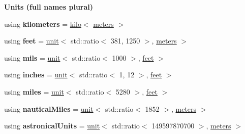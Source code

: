 \begin{Indent}{\bf Units (full names plural)}
\begin{DoxyCompactItemize}
\item 
\hypertarget{namespaceunits_1_1length_ac0c991764c90f8bdf9300e8eeadca808}{}using {\bfseries kilometers} = \hyperlink{group___unit_manipulators_ga89965a45aaa6689548b9c53858759c5e}{kilo}$<$ \hyperlink{structunits_1_1unit}{meters} $>$\label{namespaceunits_1_1length_ac0c991764c90f8bdf9300e8eeadca808}

\item 
\hypertarget{namespaceunits_1_1length_ae0a92d647c8d36063046311f0bee37b6}{}using {\bfseries feet} = \hyperlink{structunits_1_1unit}{unit}$<$ std\+::ratio$<$ 381, 1250 $>$, \hyperlink{structunits_1_1unit}{meters} $>$\label{namespaceunits_1_1length_ae0a92d647c8d36063046311f0bee37b6}

\item 
\hypertarget{namespaceunits_1_1length_aad935b287b43a981a1b395b54440e9e7}{}using {\bfseries mils} = \hyperlink{structunits_1_1unit}{unit}$<$ std\+::ratio$<$ 1000 $>$, \hyperlink{structunits_1_1unit}{feet} $>$\label{namespaceunits_1_1length_aad935b287b43a981a1b395b54440e9e7}

\item 
\hypertarget{namespaceunits_1_1length_a437252541b0b3579b4a872e7ed0ab113}{}using {\bfseries inches} = \hyperlink{structunits_1_1unit}{unit}$<$ std\+::ratio$<$ 1, 12 $>$, \hyperlink{structunits_1_1unit}{feet} $>$\label{namespaceunits_1_1length_a437252541b0b3579b4a872e7ed0ab113}

\item 
\hypertarget{namespaceunits_1_1length_a30b982fffa55c67e92549c15dd75ceb4}{}using {\bfseries miles} = \hyperlink{structunits_1_1unit}{unit}$<$ std\+::ratio$<$ 5280 $>$, \hyperlink{structunits_1_1unit}{feet} $>$\label{namespaceunits_1_1length_a30b982fffa55c67e92549c15dd75ceb4}

\item 
\hypertarget{namespaceunits_1_1length_ac7eb51a84472b55714cb30b2ee974d6e}{}using {\bfseries nautical\+Miles} = \hyperlink{structunits_1_1unit}{unit}$<$ std\+::ratio$<$ 1852 $>$, \hyperlink{structunits_1_1unit}{meters} $>$\label{namespaceunits_1_1length_ac7eb51a84472b55714cb30b2ee974d6e}

\item 
\hypertarget{namespaceunits_1_1length_a1b5b124c8e18bfcc9e5c24b8f1da8986}{}using {\bfseries astronical\+Units} = \hyperlink{structunits_1_1unit}{unit}$<$ std\+::ratio$<$ 149597870700 $>$, \hyperlink{structunits_1_1unit}{meters} $>$\label{namespaceunits_1_1length_a1b5b124c8e18bfcc9e5c24b8f1da8986}


\end{DoxyCompactItemize}
\end{Indent}
